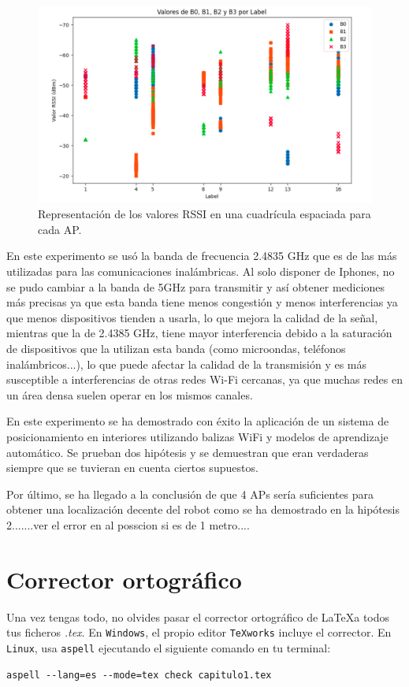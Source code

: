 \begin{figure}[H]
  \centering
  \includegraphics[scale=0.4]{figs/vals2} %
  \caption{ Representación de los valores RSSI en una cuadrícula espaciada para cada AP.}
  \label{fig:vals2}
\end{figure} 

En este experimento se usó la banda de frecuencia 2.4835 GHz que es de las más utilizadas para las comunicaciones inalámbricas. Al solo disponer de Iphones, no se pudo cambiar a la banda de 5GHz para transmitir y así obtener mediciones más precisas ya que esta banda tiene menos congestión y menos interferencias ya que menos dispositivos tienden a usarla, lo que mejora la calidad de la señal, mientras que la de 2.4385 GHz, tiene mayor interferencia debido a la saturación de dispositivos que la utilizan esta banda (como microondas, teléfonos inalámbricos...), lo que puede afectar la calidad de la transmisión y es más susceptible a interferencias de otras redes Wi-Fi cercanas, ya que muchas redes en un área densa suelen operar en los mismos canales.

En este experimento se ha demostrado con éxito la aplicación de un sistema de posicionamiento en interiores utilizando balizas WiFi y modelos de aprendizaje automático. Se prueban dos hipótesis y se demuestran que eran verdaderas siempre que se tuvieran en cuenta ciertos supuestos.

Por último, se ha llegado a la conclusión de que 4 APs sería suficientes para obtener una localización decente del robot como se ha demostrado en la hipótesis 2.......ver el error en al posscion si es de 1 metro....




\section{Corrector ortográfico}

Una vez tengas todo, no olvides pasar el corrector ortográfico de \LaTeX a todos tus ficheros \textit{.tex}. En \texttt{Windows}, el propio editor \texttt{TeXworks} incluye el corrector. En \texttt{Linux}, usa \texttt{aspell} ejecutando el siguiente comando en tu terminal:

\begin{verbatim}
aspell --lang=es --mode=tex check capitulo1.tex
\end{verbatim}
